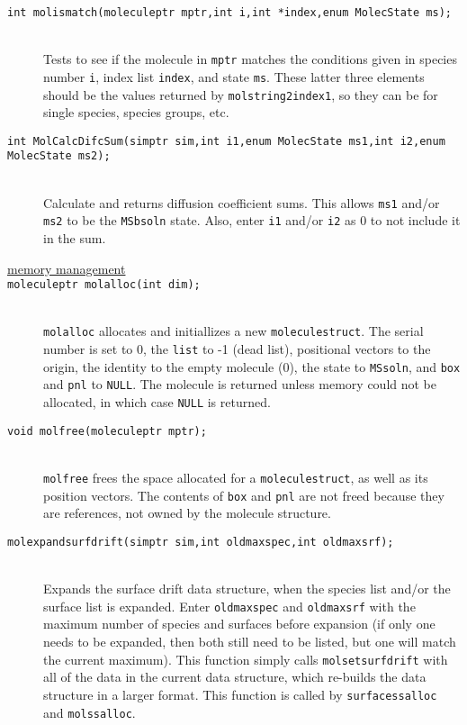 \documentclass {book}
\begin{document}
\begin{description}
\item[\texttt{int molismatch(moleculeptr mptr,int i,int *index,enum MolecState ms);}]
\hfill \\
Tests to see if the molecule in \texttt{mptr} matches the conditions given in species number \texttt{i}, index list \texttt{index}, and state \texttt{ms}. These latter three elements should be the values returned by \texttt{molstring2index1}, so they can be for single species, species groups, etc.

\item[\texttt{int MolCalcDifcSum(simptr sim,int i1,enum MolecState ms1,int i2,enum MolecState ms2);}]
\hfill \\
Calculate and returns diffusion coefficient sums. This allows \texttt{ms1} and/or \texttt{ms2} to be the \texttt{MSbsoln} state. Also, enter \texttt{i1} and/or \texttt{i2} as 0 to not include it in the sum.

\item[\underline{memory management}]

\item[\texttt{moleculeptr molalloc(int dim);}]
\hfill \\
\texttt{molalloc} allocates and initiallizes a new \texttt{moleculestruct}. The serial number is set to 0, the \texttt{list} to -1 (dead list), positional vectors to the origin, the identity to the empty molecule (0), the state to \texttt{MSsoln}, and \texttt{box} and \texttt{pnl} to \texttt{NULL}. The molecule is returned unless memory could not be allocated, in which case \texttt{NULL} is returned.

\item[\texttt{void molfree(moleculeptr mptr);}]
\hfill \\
\texttt{molfree} frees the space allocated for a \texttt{moleculestruct}, as well as its position vectors. The contents of \texttt{box} and \texttt{pnl} are not freed because they are references, not owned by the molecule structure.

\item[\texttt{molexpandsurfdrift(simptr sim,int oldmaxspec,int oldmaxsrf);}]
\hfill \\
Expands the surface drift data structure, when the species list and/or the surface list is expanded. Enter \texttt{oldmaxspec} and \texttt{oldmaxsrf} with the maximum number of species and surfaces before expansion (if only one needs to be expanded, then both still need to be listed, but one will match the current maximum). This function simply calls \texttt{molsetsurfdrift} with all of the data in the current data structure, which re-builds the data structure in a larger format. This function is called by \texttt{surfacessalloc} and \texttt{molssalloc}.


\end{description}
\end{document}
